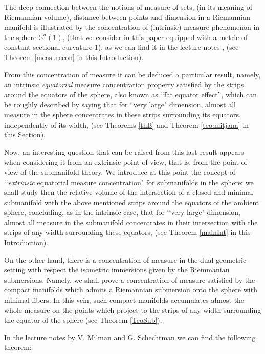 \documentclass[11pt,letterpaper]{amsart}
\theoremstyle{definition}
\theoremstyle{remark}
\newcommand{\ese}{\mathbb{S}}
\begin{document}
The deep connection between the notions of measure of sets, (in its meaning of Riemannian volume), distance between points and dimension in a Riemannian manifold is illustrated by the concentration of (intrinsic) measure phenomenon in the sphere $\ese^n(1)$, (that we consider in this paper equipped with a metric of constant sectional curvature $1$), as we can find it in the lecture notes \cite{MS}, (see Theorem \ref{measurecon} in this Introduction).

From this concentration of measure  it can be deduced a particular result, namely, an intrinsic {\em equatorial} measure concentration property satisfied by the strips around the equators of the sphere, also known as \lq\lq fat equator effect'', which can be roughly described by saying that for ``very large" dimension, almost all measure in the sphere concentrates in these strips surrounding its equators, independently of its width, (see Theorems \ref{thB} and Theorem \ref{teo:mitjana} in this Section). 

Now, an interesting question that can be raised from this last result appears when considering it from an extrinsic point of view, that is, from the point of view of the submanifold theory. 
We introduce at this point  the concept of \lq\lq {\em extrinsic} equatorial measure concentration"  for submanifolds in the sphere: we shall study then the relative volume of the intersection of a closed and minimal submanifold with the above mentioned strips around the equators of the ambient sphere, concluding, as in the intrinsic case, that for \lq\lq very large" dimension, almost all measure in the submanifold concentrates in their intersection with the strips of any width surrounding these equators, (see Theorem \ref{mainInt} in this Introduction). 


On the other hand, there is a concentration of measure in the dual geometric setting with respect the isometric immersions given by the Riemmanian submersions. Namely, we shall prove a concentration of measure satisfied by the compact manifolds which admits a Riemannian submersion onto the sphere with minimal fibers. In this vein, such compact manifolds
 accumulates almost the whole measure on the  points which project to the strips of any width surrounding the equator of the sphere (see Theorem \ref{TeoSub}).

In the lecture notes by V. Milman and G. Schechtman \cite{MS} we can find the following theorem:
\end{document}

